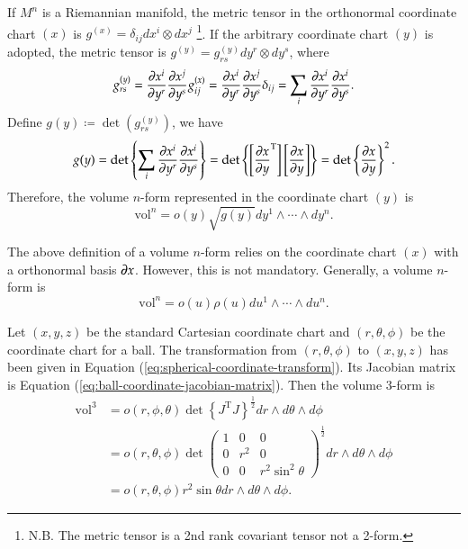 \documentclass[11pt, a4paper]{book}
\begin{document}
If $M^n$ is a Riemannian manifold, the metric tensor in the orthonormal coordinate chart
$(x)$ is $g^{(x)} = \delta_{ij} dx^i \otimes dx^j$ \footnote{N.B. The metric tensor is a
  2nd rank covariant tensor not a 2-form.}. If the arbitrary coordinate chart $(y)$
is adopted, the metric tensor is $g^{(y)} = g_{rs}^{(y)} dy^r \otimes dy^s$, where
\begin{equation*}
  g_{rs}^{(y)} = \frac{\partial x^i}{\partial y^r} \frac{\partial x^j}{\partial y^s} g_{ij}^{(x)}
  = \frac{\partial x^i}{\partial y^r} \frac{\partial x^j}{\partial y^s} \delta_{ij} = \sum_i
  \frac{\partial x^i}{\partial y^r} \frac{\partial x^i}{\partial y^s}.
\end{equation*}
Define $g(y) \coloneqq \det(g_{rs}^{(y)})$, we have
\begin{equation*}
  g(y) = \det \left\{ \sum_i
    \frac{\partial x^i}{\partial y^r} \frac{\partial x^i}{\partial y^s} \right\} = \det \left\{
    \left[ \frac{\partial x}{\partial y}^{\mathrm{T}} \right] \left[ \frac{\partial x}{\partial y}
    \right] \right\} = \det \left\{ \frac{\partial x}{\partial y} \right\}^2.
\end{equation*}
Therefore, the volume $n$-form represented in the coordinate chart $(y)$ is
\begin{equation}
  \label{eq:volume-3-form}
  \mathrm{vol}^n = o(y) \sqrt{g(y)} dy^1 \wedge\cdots\wedge dy^n.
\end{equation}
\begin{Remark}
  The above definition of a volume $n$-form relies on the coordinate chart $(x)$ with a
  orthonormal basis $\boldsymbol{\partial}x$. However, this is not mandatory. Generally, a volume
  $n$-form is
  \begin{equation}
    \mathrm{vol}^n = o(u) \rho(u) du^1 \wedge \cdots \wedge du^n.
  \end{equation}
\end{Remark}

\begin{Example}
  Let $(x,y,z)$ be the standard Cartesian coordinate chart and $(r,\theta,\phi)$ be the
  coordinate chart for a ball. The transformation from $(r,\theta,\phi)$ to $(x,y,z)$
  has been given in Equation (\ref{eq:spherical-coordinate-transform}). Its Jacobian
  matrix is Equation (\ref{eq:ball-coordinate-jacobian-matrix}). Then the volume 3-form is
  \begin{equation}
    \begin{aligned}
      \mathrm{vol}^3 &= o(r,\phi,\theta) \det \left\{ J^{\mathrm{T}} J
      \right\}^{\frac{1}{2}} dr \wedge d\theta \wedge d\phi \\
      &= o(r,\theta,\phi) \det \begin{pmatrix}
        1 & 0 & 0 \\
        0 & r^2 & 0 \\
        0 & 0 & r^2\sin^2\theta
      \end{pmatrix}^{\frac{1}{2}} dr \wedge d\theta \wedge d\phi \\
      & = o(r,\theta,\phi) r^2\sin\theta dr \wedge d\theta \wedge d\phi.
    \end{aligned}
  \end{equation}
\end{Example}
\end{document}
